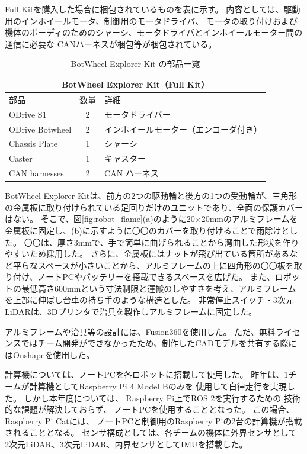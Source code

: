 \documentclass[twocolumn,9pt]{jsproceedings}
\begin{document}
Full Kitを購入した場合に梱包されているものを表に示す。
内容としては、駆動用のインホイールモータ、制御用のモータドライバ、
モータの取り付けおよび機体のボーディのためのシャーシ、モータドライバとインホイールモーター間の通信に必要な
CANハーネスが梱包等が梱包されている。
\begin{table}[h]
  \centering
  \begin{tabular}{|l|c|l|}
      \hline
      \multicolumn{3}{|c|}{\textbf{BotWheel Explorer Kit（Full Kit）}} \\
      \hline
      部品 & 数量 & 詳細 \\
      \hline
      ODrive S1 & 2 & モータドライバー \\
      ODrive Botwheel & 2 & インホイールモーター（エンコーダ付き） \\
      Chassis Plate & 1 & シャーシ \\
      Caster & 1 & キャスター \\
      CAN harnesses & 2 & CAN ハーネス \\
      \hline
  \end{tabular}
  \caption{BotWheel Explorer Kit の部品一覧}
  \label{tab:botwheel_kit}
\end{table}


BotWheel Explorer Kitは、前方の2つの駆動輪と後方の1つの受動輪が、三角形の金属板に取り付けられている足回りだけのユニットであり、全面の保護カバーはない。
そこで、図\ref{fig:robot_flame}(a)のように20×20mmのアルミフレームを金属板に固定し、(b)に示すように〇〇のカバーを取り付けることで雨除けとした。
〇〇は、厚さ3mmで、手で簡単に曲げられることから湾曲した形状を作りやすいため採用した。
さらに、金属板にはナットが飛び出ている箇所があるなど平らなスペースが小さいことから、アルミフレームの上に四角形の〇〇板を取り付け、ノートPCやバッテリーを搭載できるスペースを広げた。
また、ロボットの最低高さ600mmという寸法制限と運搬のしやすさを考え、アルミフレームを上部に伸ばし台車の持ち手のような構造とした。
非常停止スイッチ・3次元LiDARは、3Dプリンタで治具を製作しアルミフレームに固定した。

アルミフレームや治具等の設計には、Fusion360\cite{Fusion360}を使用した。
ただ、無料ライセンスではチーム開発ができなかったため、制作したCADモデルを共有する際にはOnshape\cite{Onshape}を使用した。



計算機については、ノートPCを各ロボットに搭載して使用した。
昨年は、1チームが計算機としてRaspberry Pi 4 Model Bのみを
使用して自律走行を実現した\cite{池邉2022}。
しかし本年度については、
Raspberry Pi上でROS 2を実行するための
技術的な課題が解決しておらず、
ノートPCを使用することとなった。
この場合、Raspberry Pi Catには、
ノートPCと制御用のRaspberry Piの2台の計算機が搭載されることとなる。
センサ構成としては、各チームの機体に外界センサとして
2次元LiDAR、3次元LiDAR、内界センサとしてIMUを搭載した。
\end{document}
